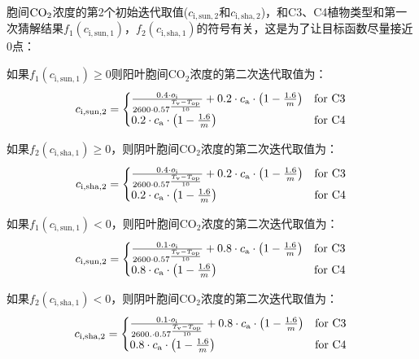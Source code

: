 胞间$\rm CO_2$浓度的第2个初始迭代取值($c_{\mathrm{i,sun,2}}$和$c_{\mathrm{i,sha,2}}$)，和C3、C4植物类型和第一次猜解结果$f_{1}\left(c_{\mathrm{i,sun,1}}\right)$，$f_{2}\left(c_{\mathrm{i,sha,1}}\right)$的符号有关，这是为了让目标函数尽量接近0点：

如果$f_{1}\left(c_{\mathrm{i,sun,1}}\right)\geqslant 0$则阳叶胞间$\mathrm {CO_2}$浓度的第二次迭代取值为：
\begin{align}\label{cisun_2_fp}
c_{\mathrm{i,sun,2}}=
\begin{cases}
\frac{0.4 \cdot o_{\mathrm{i}}} {2600 \cdot 0.57 ^\frac{T_{\mathrm{{v }}} -  T_{\mathrm{o p}}}{10}} + 0.2\cdot c_{\mathrm{a}}\cdot\left(1-\frac{1.6}{m}\right)  &\rm for\,\, C3\\
0.2\cdot c_{\mathrm{a}}\cdot\left(1-\frac{1.6}{m}\right) &\rm for\,\, C4
\end{cases}
\end{align}

如果$f_{2}\left(c_{\mathrm{i,sha,1}}\right)\geqslant0$，则阴叶胞间$\mathrm {CO_2}$浓度的第二次迭代取值为：
\begin{align}\label{cisha_2_fp}
c_{\mathrm{i,sha,2}}=
\begin{cases}
\frac{0.4 \cdot o_{\mathrm{i}}} {2600 \cdot 0.57 ^\frac{T_{\mathrm{{v }}} -  T_{\mathrm{o p}}}{10}} + 0.2\cdot c_{\mathrm{a}}\cdot\left(1-\frac{1.6}{m}\right)  &\rm for\,\, C3\\
0.2\cdot c_{\mathrm{a}}\cdot\left(1-\frac{1.6}{m}\right) &\rm for\,\, C4
\end{cases}
\end{align}

如果$f_{1}\left(c_{\mathrm{i,sun,1}}\right)<0$，则阳叶胞间$\mathrm {CO_2}$浓度的第二次迭代取值为：
\begin{align}\label{cisun_2_fn}
c_{\mathrm{i,sun,2}}=
\begin{cases}
\frac{0.1 \cdot o_{\mathrm{i}}} {2600 \cdot 0.57 ^\frac{T_{\mathrm{{v }}} -  T_{\mathrm{o p}}}{10}} + 0.8\cdot c_{\mathrm{a}}\cdot\left(1-\frac{1.6}{m}\right)  &\rm for\,\, C3\\
0.8\cdot c_{\mathrm{a}}\cdot\left(1-\frac{1.6}{m}\right) &\rm for\,\, C4
\end{cases}
\end{align}

如果$f_{2}\left(c_{\mathrm{i,sha,1}}\right)<0$，则阴叶胞间$\mathrm {CO_2}$浓度的第二次迭代取值为：
\begin{align}\label{cisha_2_fn}
c_{\mathrm{i,sha,2}}=
\begin{cases}
\frac{0.1 \cdot o_{\mathrm{i}}} {2600. \cdot 0.57 ^\frac{T_{\mathrm{{v }}} -  T_{\mathrm{o p}}}{10}} + 0.8\cdot c_{\mathrm{a}}\cdot\left(1-\frac{1.6}{m}\right)  &\rm for\,\, C3\\
0.8\cdot c_{\mathrm{a}}\cdot\left(1-\frac{1.6}{m}\right) &\rm for\,\, C4
\end{cases}
\end{align}

